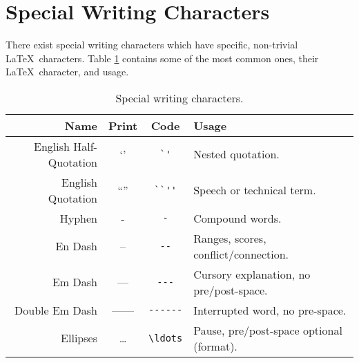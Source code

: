 \section{Special Writing Characters}
%
There exist special writing characters which have specific, non-trivial \LaTeX~characters. Table \ref{t:swc} contains some of the most common ones, their \LaTeX~character, and usage.
\begin{table}[!htbp]
    \centering
    \caption{Special writing characters.}
    \label{t:swc}
    \begin{tabular}{rccl}
        \toprule
        Name & Print & Code & Usage \\
        \midrule
        English Half-Quotation & `' & \verb|`'| & Nested quotation. \\
        English Quotation & ``'' & \verb|``''| & Speech or technical term. \\
        Hyphen & - & \verb|-| & Compound words. \\
        En Dash & -- & \verb|--| & Ranges, scores, conflict/connection. \\
        Em Dash & --- & \verb|---| & Cursory explanation, no pre/post-space. \\
        Double Em Dash & ------ & \verb|------| & Interrupted word, no pre-space. \\
        Ellipses & \ldots & \verb|\ldots| & Pause, pre/post-space optional (format). \\
        \bottomrule
    \end{tabular}
\end{table}
%
